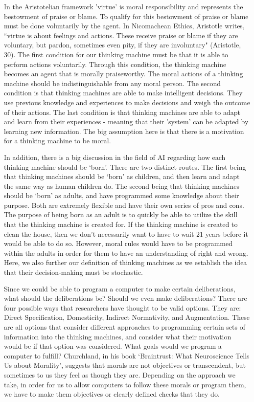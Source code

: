 \documentclass[11pt]{article}
\begin{document}
\par In the Aristotelian framework 'virtue' is moral responsibility and represents the bestowment of praise or blame. To qualify for this bestowment of praise or blame must be done voluntarily by the agent. In Nicomachean Ethics, Aristotle writes, ``virtue is about feelings and actions. These receive praise or blame if they are voluntary, but pardon, sometimes even pity, if they are involuntary" (Aristotle, 30). The first condition for our thinking machine must be that it is able to perform actions voluntarily. Through this condition, the thinking machine becomes an agent that is morally praiseworthy. The moral actions of a thinking machine should be indistinguishable from any moral person. The second condition is that thinking machines are able to make intelligent decisions. They use previous knowledge and experiences to make decisions and weigh the outcome of their actions. The last condition is that thinking machines are able to adapt and learn from their experiences - meaning that their 'system' can be adapted by learning new information. The big assumption here is that there is a motivation for a thinking machine to be moral.

\par In addition, there is a big discussion in the field of AI regarding how each thinking machine should be `born'. There are two distinct routes. The first being that thinking machines should be `born' as children, and then learn and adapt the same way as human children do. The second being that thinking machines should be `born' as adults, and have programmed some knowledge about their purpose. Both are extremely flexible and have their own series of pros and cons. The purpose of being born as an adult is to quickly be able to utilize the skill that the thinking machine is created for. If the thinking machine is created to clean the house, then we don't necessarily want to have to wait 21 years before it would be able to do so. However, moral rules would have to be programmed within the adults in order for them to have an understanding of right and wrong. Here, we also further our definition of thinking machines as we establish the idea that their decision-making must be stochastic.

\par Since we could be able to program a computer to make certain deliberations, what should the deliberations be? Should we even make deliberations? There are four possible ways that researchers have thought to be valid options. They are: Direct Specification, Domesticity, Indirect Normativity, and Augmentation. These are all options that consider different approaches to programming certain sets of information into the thinking machines, and consider what their motivation would be if that option was considered. What goals would we program a computer to fulfill? Churchland, in his book `Braintrust: What Neuroscience Tells Us about Morality', suggests that morals are not objectives or transcendent, but sometimes to us they feel as though they are. Depending on the approach we take, in order for us to allow computers to follow these morals or program them, we have to make them objectives or clearly defined checks that they do.
\end{document}
